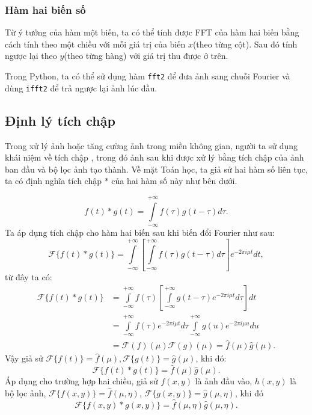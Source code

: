 \documentclass[12pt,a4paper]{report}
\numberwithin{equation}{section}
\theoremstyle{definition} %
\begin{document}
\subsubsection{Hàm hai biến số}
Từ ý tưởng của hàm một biến, ta có thể tính được FFT của hàm hai biến bằng cách tính theo một chiều với mỗi giá trị của biến $x$(theo từng cột). Sau đó tính ngược lại theo $y$(theo từng hàng) với giá trị thu được ở trên.

Trong Python, ta có thể sử dụng hàm \texttt{fft2} để đưa ảnh sang chuỗi Fourier và dùng \texttt{ifft2} để trả ngược lại ảnh lúc đầu.
\subsection{Định lý tích chập}
Trong xử lý ảnh hoặc tăng cường ảnh trong miền không gian, người ta sử dụng khái niệm về tích chập , trong đó ảnh sau khi được xử lý bằng tích chập của ảnh ban đầu và bộ lọc ảnh tạo thành. Về mặt Toán học, ta giả sử hai hàm số liên tục, ta có định nghĩa tích chập $*$ của hai hàm số này như bên dưới.

\begin{equation}
	\label{1322}
f(t) \ast g(t) = \int\limits_{-\infty}^{+\infty}f(\tau)g(t -\tau)d\tau.
\end{equation}
Ta áp dụng tích chập cho hàm hai biến sau khi biến đổi Fourier như sau: 
\begin{equation}
\label{1323}
\mathcal{F}\{f(t)\ast g(t)\} = \int\limits_{-\infty}^{+\infty}\left[\int\limits_{-\infty}^{+\infty}f(\tau)g(t-\tau)d\tau\right]e^{-2\pi i\mu t}dt,
\end{equation}
từ đây ta có: 
\begin{align*}
\mathcal{F}\{f(t)\ast g(t)\} &= \int\limits_{-\infty}^{+\infty}f(\tau)\left[\int\limits_{-\infty}^{+\infty}g(t-\tau)e^{-2\pi i\mu t}d\tau\right]dt\\
&=\int\limits_{-\infty}^{+\infty}f(\tau)e^{-2\pi i \mu t}d\tau\int\limits_{-\infty}^{+\infty}g(u)e^{-2\pi i\mu u}du\\
&=\mathcal{F}(f)(\mu)\mathcal{F}(g)(\mu)=\hat{f}(\mu)\hat{g}(\mu).
\end{align*}
Vậy giả sử $\mathcal{F}\{f(t)\} = \hat{f}(\mu), \mathcal{F}\{g(t)\} = \hat{g}(\mu)$, khi đó: 
\begin{equation}
\mathcal{F}\{f(t)\ast g(t)\} = \hat{f}(\mu)\hat{g}(\mu).
\end{equation}
Áp dụng cho trường hợp hai chiều, giả sử $f(x,y)$ là ảnh đầu vào, $h(x,y)$ là bộ lọc ảnh, $\mathcal{F}\{f(x,y)\}=\hat{f}(\mu,\eta)$, $\mathcal{F}\{g(x,y)\} = \hat{g}(\mu,\eta)$, khi đó
\begin{equation}
\mathcal{F}\{f(x,y)\ast g(x,y)\} = \hat{f}(\mu,\eta)\hat{g}(\mu,\eta).
\end{equation}
\end{document}
